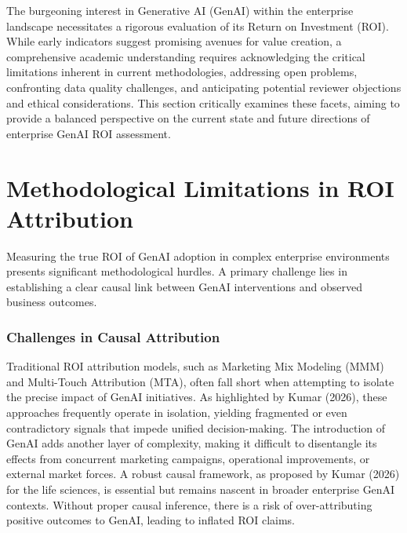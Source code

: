 \documentclass[10pt,twocolumn,letterpaper]{article}
\begin{document}
The burgeoning interest in Generative AI (GenAI) within the enterprise landscape necessitates a rigorous evaluation of its Return on Investment (ROI). While early indicators suggest promising avenues for value creation, a comprehensive academic understanding requires acknowledging the critical limitations inherent in current methodologies, addressing open problems, confronting data quality challenges, and anticipating potential reviewer objections and ethical considerations. This section critically examines these facets, aiming to provide a balanced perspective on the current state and future directions of enterprise GenAI ROI assessment.


\section{Methodological Limitations in ROI Attribution}


Measuring the true ROI of GenAI adoption in complex enterprise environments presents significant methodological hurdles. A primary challenge lies in establishing a clear causal link between GenAI interventions and observed business outcomes.


\subsubsection{Challenges in Causal Attribution}

Traditional ROI attribution models, such as Marketing Mix Modeling (MMM) and Multi-Touch Attribution (MTA), often fall short when attempting to isolate the precise impact of GenAI initiatives. As highlighted by Kumar (2026), these approaches frequently operate in isolation, yielding fragmented or even contradictory signals that impede unified decision-making. The introduction of GenAI adds another layer of complexity, making it difficult to disentangle its effects from concurrent marketing campaigns, operational improvements, or external market forces. A robust causal framework, as proposed by Kumar (2026) for the life sciences, is essential but remains nascent in broader enterprise GenAI contexts. Without proper causal inference, there is a risk of over-attributing positive outcomes to GenAI, leading to inflated ROI claims.
\end{document}
